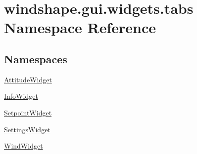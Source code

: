 \hypertarget{namespacewindshape_1_1gui_1_1widgets_1_1tabs}{}\section{windshape.\+gui.\+widgets.\+tabs Namespace Reference}
\label{namespacewindshape_1_1gui_1_1widgets_1_1tabs}
\subsection*{Namespaces}
\begin{DoxyCompactItemize}
\item 
 \mbox{\hyperlink{namespacewindshape_1_1gui_1_1widgets_1_1tabs_1_1_attitude_widget}{Attitude\+Widget}}
\item 
 \mbox{\hyperlink{namespacewindshape_1_1gui_1_1widgets_1_1tabs_1_1_info_widget}{Info\+Widget}}
\item 
 \mbox{\hyperlink{namespacewindshape_1_1gui_1_1widgets_1_1tabs_1_1_setpoint_widget}{Setpoint\+Widget}}
\item 
 \mbox{\hyperlink{namespacewindshape_1_1gui_1_1widgets_1_1tabs_1_1_settings_widget}{Settings\+Widget}}
\item 
 \mbox{\hyperlink{namespacewindshape_1_1gui_1_1widgets_1_1tabs_1_1_wind_widget}{Wind\+Widget}}
\end{DoxyCompactItemize}
